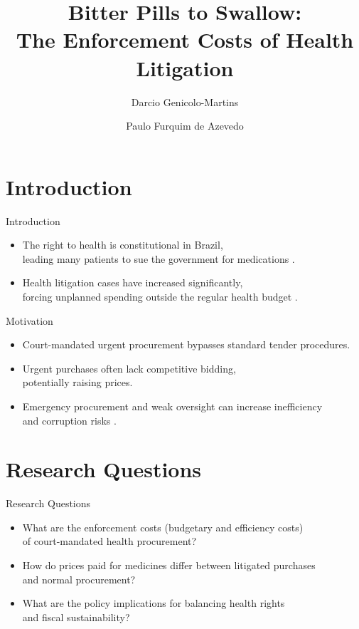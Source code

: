 \documentclass{beamer}
\title{Bitter Pills to Swallow:\\ The Enforcement Costs of Health Litigation}
\author{Darcio Genicolo-Martins \and Paulo Furquim de Azevedo}
\institute{Insper Institute of Education and Research,\\ Brazil}
\date{}  %
\begin{document}
\begin{frame}
  \titlepage
\end{frame}

\section{Introduction}

\begin{frame}{Introduction}
  \begin{itemize}
    \item The right to health is constitutional in Brazil, \\leading many patients to sue the government for medications \citep{wang2015right}.
    \item Health litigation cases have increased significantly, \\forcing unplanned spending outside the regular health budget \citep{cnj2019judicializacao}.
  \end{itemize}
\end{frame}

\begin{frame}{Motivation}
  \begin{itemize}
    \item Court-mandated urgent procurement bypasses standard tender procedures.
    \item Urgent purchases often lack competitive bidding, \\potentially raising prices.
    \item Emergency procurement and weak oversight can increase inefficiency \\and corruption risks \citep{basheka2011economic, mironov2016corruption}.
  \end{itemize}
\end{frame}

\section{Research Questions}

\begin{frame}{Research Questions}
  \begin{itemize}
    \item What are the enforcement costs (budgetary and efficiency costs) \\of court-mandated health procurement?
    \item How do prices paid for medicines differ between litigated purchases \\and normal procurement?
    \item What are the policy implications for balancing health rights \\and fiscal sustainability?
  \end{itemize}
\end{frame}
\end{document}
